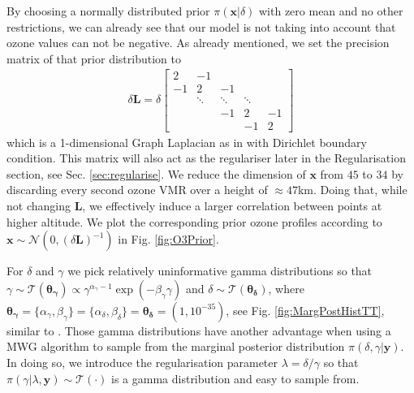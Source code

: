 By choosing a normally distributed prior $\pi(\bm{x}|\delta)$ with zero mean and no other restrictions, we can already see that our model is not taking into account that ozone values can not be negative.
As already mentioned, we set the precision matrix of that prior distribution to
\begin{align}
	\delta \bm{L} =
	\delta
	\begin{bmatrix}
		2 & -1 & & &  \\
		-1 & 2 & -1 & &   \\
		& \ddots & \ddots & \ddots &\\ 
		& & -1 & 2 & -1  \\
		& & & -1 & 2 
	\end{bmatrix} 
	\label{eq:GLapl} 
\end{align}
which is a 1-dimensional Graph Laplacian as in \cite{wang2015graphs,fox2016fast} with Dirichlet boundary condition.
This matrix will also act as the regulariser later in the Regularisation section, see Sec. \ref{sec:regularise}.
We reduce the dimension of $\bm{x}$ from $45$ to $34$ by discarding every second ozone VMR over a height of $\approx47$km.
Doing that, while not changing $\bm{L}$, we effectively induce a larger correlation between points at higher altitude.
We plot the corresponding prior ozone profiles according to $\bm{x}\sim \mathcal{N}(0, (\delta \bm{L})^{-1})$ in Fig. \ref{fig:O3Prior}.

For $\delta$ and $\gamma$ we pick relatively uninformative gamma distributions so that $\gamma \sim \mathcal{T}(\bm{\theta_{\gamma}}) \propto \gamma^{\alpha_\gamma -1 } \exp{( -\beta_\gamma \gamma) } $ and $\delta \sim \mathcal{T}(\bm{\theta_{\delta}})$, where $\bm{\theta_{\gamma}} = \{  \alpha_\gamma, \beta_\gamma\}  = \{ \alpha_\delta ,\beta_\delta\} = \bm{\theta_{\delta}} = (1,10^{-35})$, see Fig. \ref{fig:MargPostHistTT}, similar to \cite{fox2016fast}.
Those gamma distributions have another advantage when using a MWG algorithm to sample from the marginal posterior distribution $\pi(\delta, \gamma | \bm{y})$.
In doing so, we introduce the regularisation parameter $\lambda = \delta / \gamma $ so that $\pi(\gamma | \lambda, \bm{y}) \sim \mathcal{T}(\cdot)$ is a gamma distribution and easy to sample from.
\clearpage
